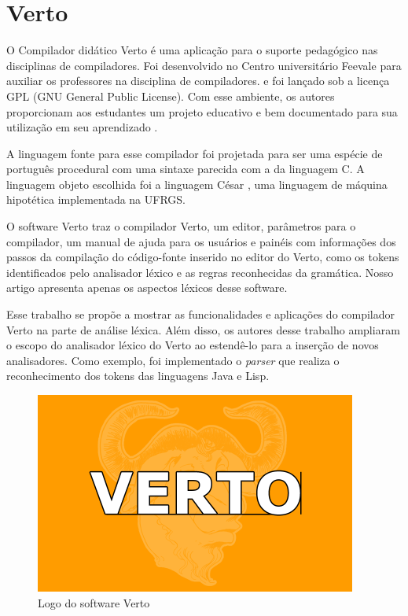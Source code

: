 \section{Verto} %
\label{sec:verto}

O Compilador didático Verto é uma aplicação para o suporte pedagógico nas disciplinas de compiladores.
Foi desenvolvido no Centro universitário Feevale para auxiliar os professores na disciplina de compiladores.
e foi lançado sob a licença GPL (GNU General Public
License). Com esse ambiente, os autores proporcionam aos estudantes um projeto 
educativo e bem documentado para sua utilização em seu aprendizado \cite{verto}.

A linguagem fonte para esse compilador foi projetada para ser uma espécie de
português procedural com uma sintaxe parecida com a da linguagem C.
A linguagem objeto escolhida foi a linguagem César \cite{cesar}, uma
linguagem de máquina hipotética implementada na UFRGS.

O software Verto traz o compilador Verto, um editor, parâmetros para o compilador,
um manual de ajuda para os usuários e painéis com informações dos passos 
da compilação do código-fonte inserido no editor do Verto,
como os tokens identificados pelo analisador léxico e as regras reconhecidas da gramática.
Nosso artigo apresenta apenas os aspectos léxicos desse software.

Esse trabalho se propõe a mostrar as funcionalidades e aplicações do compilador Verto 
na parte de análise léxica.
Além disso, os autores desse trabalho ampliaram o escopo do analisador léxico do Verto 
ao estendê-lo para a inserção de novos analisadores.
Como exemplo, foi implementado o \emph{parser} 
que realiza o reconhecimento dos tokens das linguagens Java e Lisp.


\begin{figure}[ht!]
	\centering
	\includegraphics[scale=0.7]{imgs/Verto.png}
	\caption{Logo do software Verto}
	\label{verto-inicial}
\end{figure}

